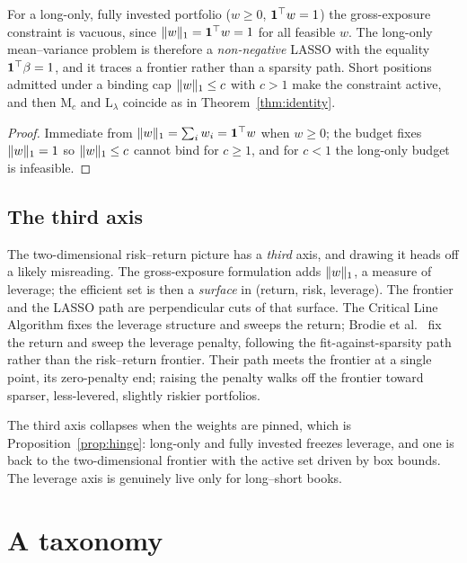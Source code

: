 \begin{proposition}
\label{prop:hinge}
For a long-only, fully invested portfolio ($w \ge 0$, $\mathbf{1}^{\top} w = 1$) the
gross-exposure constraint is vacuous, since $\lVert w \rVert_1 = \mathbf{1}^{\top} w = 1$ for all
feasible $w$. The long-only mean--variance problem is therefore a
\emph{non-negative} LASSO with the equality $\mathbf{1}^{\top}\beta = 1$, and it traces a
frontier rather than a sparsity path. Short positions admitted under a binding cap
$\lVert w \rVert_1 \le c$ with $c > 1$ make the constraint active, and then $\mathrm{M}_c$
and $\mathrm{L}_\lambda$ coincide as in Theorem~\ref{thm:identity}.
\end{proposition}

\begin{proof}
Immediate from $\lVert w \rVert_1 = \sum_i w_i = \mathbf{1}^{\top} w$ when $w \ge 0$; the budget
fixes $\lVert w \rVert_1 = 1$ so $\lVert w \rVert_1 \le c$ cannot bind for $c \ge 1$, and for
$c < 1$ the long-only budget is infeasible.
\end{proof}

\subsection{The third axis}

The two-dimensional risk--return picture has a \emph{third} axis, and drawing it
heads off a likely misreading. The gross-exposure formulation adds
$\lVert w \rVert_1$, a measure of leverage; the efficient set is then a \emph{surface} in
(return, risk, leverage). The frontier and the LASSO path are perpendicular cuts of
that surface. The Critical Line Algorithm fixes the leverage structure and sweeps
the return; Brodie et al.\ \cite{brodie2009} fix the return and sweep the leverage
penalty, following the fit-against-sparsity path rather than the risk--return
frontier. Their path meets the frontier at a single point, its zero-penalty end;
raising the penalty walks off the frontier toward sparser, less-levered, slightly
riskier portfolios.

The third axis collapses when the weights are pinned, which is
Proposition~\ref{prop:hinge}: long-only and fully invested freezes leverage, and one
is back to the two-dimensional frontier with the active set driven by box bounds.
The leverage axis is genuinely live only for long--short books.

\section{A taxonomy}
\label{sec:taxonomy}

